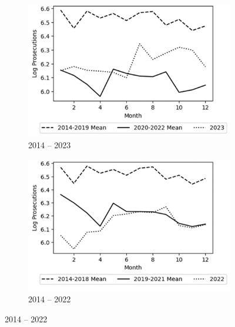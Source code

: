 \begin{figure}[htbp]
  \centering
  \caption{Monthly Log Total Of SFDA Prosecutions}
  \begin{subfigure}[b]{0.48\textwidth}
    \includegraphics[width=\textwidth]{graphs/sfda_action_graphs/Monthly Log Total Of Prosecutions A.png}
    \caption*{2014 – 2023}
    \label{subfig:left_p}
  \end{subfigure}
  \hfill
  \begin{subfigure}[b]{0.48\textwidth}
    \includegraphics[width=\textwidth]{graphs/sfda_action_graphs/Monthly Log Total Of Prosecutions B.png}
    \caption*{2014 – 2022}
    \label{subfig:right_p}
  \end{subfigure}
  \label{fig:overall_p}
\end{figure}